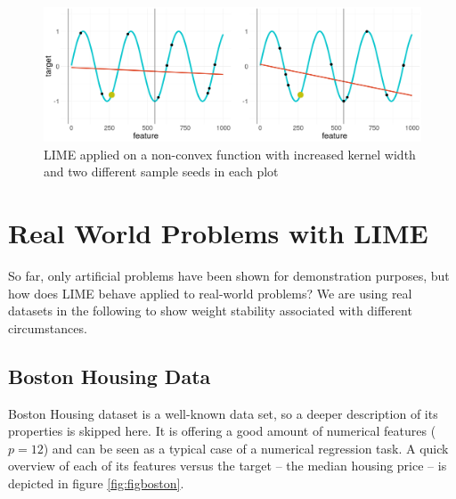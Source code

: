 \documentclass[
]{krantz}
\begin{document}
\begin{figure}

{\centering \includegraphics[width=19.44in]{images/nonconvex_samples_width81000_1vs2} 

}

\caption{LIME applied on a non-convex function with increased kernel width and two different sample seeds in each plot}\label{fig:figkernel}
\end{figure}

\hypertarget{real-world-problems-with-lime}{%
\section{Real World Problems with LIME}\label{real-world-problems-with-lime}}

So far, only artificial problems have been shown for demonstration purposes, but how does LIME behave applied to real-world problems?
We are using real datasets in the following to show weight stability associated with different circumstances.

\hypertarget{boston-housing-data}{%
\subsection{Boston Housing Data}\label{boston-housing-data}}

Boston Housing dataset is a well-known data set, so a deeper description of its properties is skipped here.
It is offering a good amount of numerical features (\(p = 12\)) and can be seen as a typical case of a numerical regression task.
A quick overview of each of its features versus the target -- the median housing price -- is depicted in figure \ref{fig:figboston}.
\end{document}
